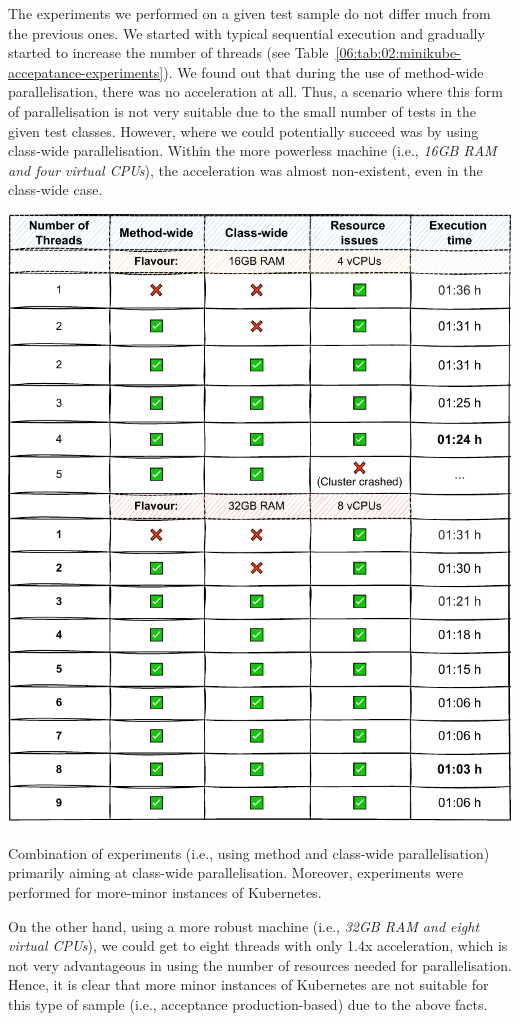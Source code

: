 The experiments we performed on a given test sample do not differ much from the previous ones.
We started with typical sequential execution and gradually started to increase the number of threads (see Table~\ref{06:tab:02:minikube-accepatance-experiments}).
We found out that during the use of method-wide parallelisation, there was no acceleration at all.
Thus, a scenario where this form of parallelisation is not very suitable due to the small number of tests in the given test classes.
However, where we could potentially succeed was by using class-wide parallelisation.
Within the more powerless machine (i.e., \emph{16GB RAM and four virtual CPUs}), the acceleration was almost non-existent, even in the class-wide case.
\begin{table}[ht!]
    \centering
    \includegraphics[scale=0.8]{obrazky-figures/08-experiments/acceptance/06-exp-minikube-accpeantace-second}
    \caption{Combination of experiments (i.e., using method and class-wide parallelisation) primarily aiming at class-wide
    parallelisation. Moreover, experiments were performed for more-minor instances of Kubernetes.}
    \label{06:tab:02:minikube-accepatance-experiments}
\end{table}
On the other hand, using a more robust machine (i.e., \emph {32GB RAM and eight virtual CPUs}),
we could get to eight threads with only 1.4x acceleration, which is not very advantageous in using the number of resources needed for parallelisation.
Hence, it is clear that more minor instances of Kubernetes are not suitable for this type of sample (i.e., acceptance production-based) due to the above facts.

